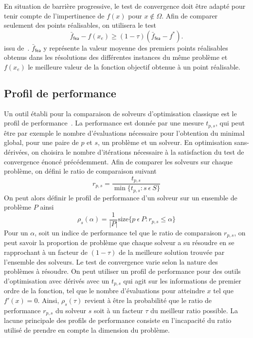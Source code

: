 En situation de barrière progressive, le test de convergence doit être adapté pour tenir compte de l'impertinence de $f(x)$ pour $x\notin \Omega$. Afin de comparer seulement des points réalisables, on utilisera le test
\begin{equation*}
\bar{f}_{\textsf{fea}} - f(x_e) \geq(1-\tau)(\bar{f}_{\textsf{fea}}-f^*).
\end{equation*}
issu de~\cite{AuTr17}. $\bar{f}_{\textsf{fea}}$ y représente la valeur moyenne des premiers points réalisables obtenus dans les résolutions des différentes instances du même problème et $f(x_e)$ le meilleure valeur de la fonction objectif obtenue à un point réalisable.
\subsection{Profil de performance}\label{sec:pdp}
Un outil établi pour la comparaison de solveurs d'optimisation classique est le profil de performance~\cite{DoMo02}. La performance est donnée par une mesure $t_{p,s}$, qui peut être par exemple le nombre d'évaluations nécessaire pour l'obtention du minimal global, pour une paire de $p$ et $s$, un problème et un solveur. En optimisation sans-dérivées, on choisira le nombre d'itérations nécessaire à la satisfaction du test de convergence énoncé précédemment. Afin de comparer les solveurs sur chaque problème, on défini le ratio de comparaison suivant
\begin{equation*}
r_{p,s}=\frac{t_{p,s}}{\min\{t_{p,s} : s\  \epsilon \  S\}}
\end{equation*}
On peut alors définir le profil de performance d'un solveur sur un ensemble de problème $P$ ainsi
\begin{equation*}
\rho_s(\alpha)=\frac{1}{|P|}\text{size}\{p\ \epsilon \ P : r_{p,s} \leq \alpha \}
\end{equation*}
Pour un $\alpha$, soit un indice de performance tel que le ratio de comparaison $r_{p,s}$, on peut savoir la proportion de problème que chaque solveur a su résoudre en se rapprochant à un facteur de $(1-\tau)$ de la meilleure solution trouvée par l'ensemble des solveurs. Le test de convergence varie selon la nature des problèmes à résoudre. On peut utiliser un profil de performance pour des outils d'optimisation avec dérivés avec un $t_{p,s}$ qui agit sur les informations de premier ordre de la fonction, tel que le nombre d'évaluations pour atteindre $x$ tel que $f'(x)=0$. Ainsi, $\rho_s(\tau)$ revient à être la probabilité que le ratio de performance $r_{p,s}$ du solveur $s$ soit à un facteur $\tau$ du meilleur ratio possible. La lacune principale des profils de performance consiste en l'incapacité du ratio utilisé de prendre en compte la dimension du problème.

